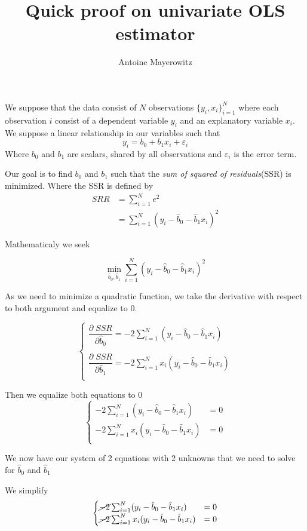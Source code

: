 \documentclass[a4paper,12pt]{article}
\title{Quick proof on univariate OLS estimator}
\author{Antoine Mayerowitz}
\newcommand\bhat[1]{\hat{b}_#1}
\newcommand\sumin{\sum_{i=1}^N}
\begin{document}
\maketitle

We suppose that the data consist of $N$ observations $\{y_i, x_i\}_{i=1}^N$ where each observation $i$ consist of a dependent variable $y_i$ and an explanatory variable $x_i$. We suppose a linear relationship in our variables such that
\begin{equation}
	y_i = b_0 + b_1 x_i + \varepsilon_i
\end{equation}
Where $b_0$ and $b_1$ are scalars, shared by all observations and $\varepsilon_i$ is the error term.

Our goal is to find $b_0$ and $b_1$ such that the \emph{sum of squared of residuals}(SSR) is minimized. Where the SSR is defined by
\begin{align*}
	SRR &= \sumin e^2 \\
			&= \sumin (y_i-\bhat{0}-\bhat{1}x_i)^2
\end{align*}

Mathematicaly we seek

\begin{equation}
	\min_{\bhat{0},\bhat{1}} \sumin (y_i-\bhat{0}-\bhat{1}x_i)^2
\end{equation}

As we need to minimize a quadratic function, we take the derivative with respect to both argument and equalize to 0.

\[
\begin{cases}
	\dfrac{\partial \; SSR}{\partial \bhat{0}} = -2 \sumin (y_i-\bhat{0}-\bhat{1}x_i) \\
	~\\
	\dfrac{\partial \; SSR}{\partial \bhat{1}} = -2 \sumin x_i (y_i-\bhat{0}-\bhat{1}x_i) \\
\end{cases}
\]

Then we equalize both equations to 0
\[
\begin{cases}
	-2 \sumin (y_i-\bhat{0}-\bhat{1}x_i) &= 0 \\
	-2 \sumin x_i (y_i-\bhat{0}-\bhat{1}x_i) &= 0 \\
\end{cases}
\]

We now have our system of 2 equations with 2 unknowns that we need to solve for $\bhat{0}$ and $\bhat{1}$

We simplify
\[
\begin{cases}
	\cancel{-2} \sumin (y_i-\bhat{0}-\bhat{1}x_i) &= 0 \\
	\cancel{-2} \sumin x_i (y_i-\bhat{0}-\bhat{1}x_i) &= 0 \\
\end{cases}
\]
\end{document}
